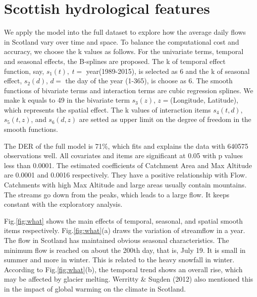 \documentclass[12pt,oneside]{reedthesis}
\begin{document}
\hypertarget{scottish-hydrological-features}{%
\section{Scottish hydrological features}\label{scottish-hydrological-features}}

We apply the model into the full dataset to explore how the average daily flows in Scotland vary over time and space. To balance the computational cost and accuracy, we choose the k values as follows. For the univariate terms, temporal and seasonal effects, the B-splines are proposed. The k of temporal effect function, say, \(s_1(t),\;t=\) year(1989-2015), is selected as 6 and the k of seasonal effect, \(s_2(d)\), \(d=\) the day of the year (1-365), is choose as 6. The smooth functions of bivariate terms and interaction terms are cubic regression splines. We make k equals to 49 in the bivariate term \(s_3(z)\), \(z=\)(Longitude, Latitude), which represents the spatial effect. The k values of interaction items \(s_4(t,d)\), \(s_5(t,z)\), and \(s_6(d,z)\) are setted as upper limit on the degree of freedom in the smooth functions.

The DER of the full model is 71\%, which fits and explains the data with 640575 observations well. All covariates and items are significant at 0.05 with p values less than 0.0001. The estimated coefficients of Catchment Area and Max Altitude are 0.0001 and 0.0016 respectively. They have a positive relationship with Flow. Catchments with high Max Altitude and large areas usually contain mountains. The streams go down from the peaks, which leads to a large flow. It keeps constant with the exploratory analysis.

Fig.\ref{fig:what} shows the main effects of temporal, seasonal, and spatial smooth items respectively. Fig.\ref{fig:what}(a) draws the variation of streamflow in a year. The flow in Scotland has maintained obvious seasonal characteristics. The minimum flow is reached on about the 200th day, that is, July 19. It is small in summer and more in winter. This is related to the heavy snowfall in winter. According to Fig.\ref{fig:what}(b), the temporal trend shows an overall rise, which may be affected by glacier melting. Werritty \& Sugden (2012) also mentioned this in the impact of global warming on the climate in Scotland.
\end{document}
